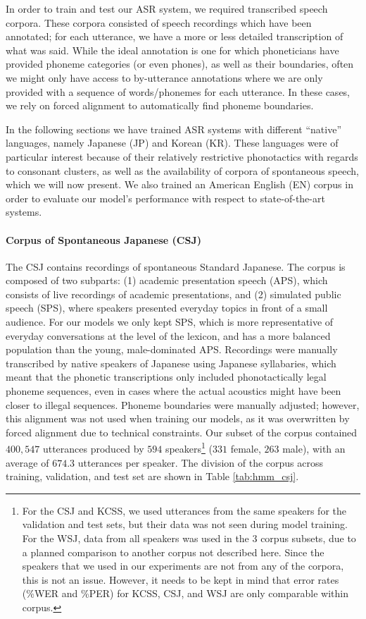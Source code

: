 In order to train and test our ASR system, we required transcribed speech corpora. These corpora consisted of speech recordings which have been annotated; for each utterance, we have a more or less detailed transcription of what was said.
While the ideal annotation is one for which phoneticians have provided phoneme categories (or even phones), as well as their boundaries, often we might only have access to by-utterance annotations where we are only provided with a sequence of words/phonemes for each utterance. In these cases, we rely on forced alignment to automatically find phoneme boundaries.

In the following sections we have trained ASR systems with different ``native'' languages, namely Japanese (JP) and Korean (KR). These languages were of particular interest because of their relatively restrictive phonotactics with regards to consonant clusters, as well as the availability of corpora of spontaneous speech, which we will now present. We also trained an American English (EN) corpus in order to evaluate our model's performance with respect to state-of-the-art systems. 

\paragraph{Corpus of Spontaneous Japanese (CSJ)}
The CSJ \cite{maekawa2003} contains recordings of spontaneous Standard Japanese. The corpus is composed of two subparts: (1) academic presentation speech (APS), which consists of live recordings of academic presentations, and (2) simulated public speech (SPS), where speakers presented everyday topics in front of a small audience. For our models we only kept SPS, which is more representative of everyday conversations at the level of the lexicon, and has a more balanced population than the young, male-dominated APS.
Recordings were manually transcribed by native speakers of Japanese using Japanese syllabaries, which meant that the phonetic transcriptions only included phonotactically legal phoneme sequences, even in cases where the actual acoustics might have been closer to illegal sequences. Phoneme boundaries were manually adjusted; however, this alignment was not used when training our models, as it was overwritten by forced alignment due to technical constraints.
Our subset of the corpus contained $400,547$ utterances produced by $594$ speakers\footnote{For the CSJ and KCSS, we used utterances from the same speakers for the validation and test sets, but their data was not seen during model training. For the WSJ, data from all speakers was used in the 3 corpus subsets, due to a planned comparison to another corpus not described here. Since the speakers that we used in our experiments are not from any of the corpora, this is not an issue. However, it needs to be kept in mind that error rates (\%WER and \%PER) for KCSS, CSJ, and WSJ are only comparable within corpus.} ($331$ female, $263$ male), with an average of $674.3$ utterances per speaker. The division of the corpus across training, validation, and test set are shown in Table \ref{tab:hmm_csj}.


